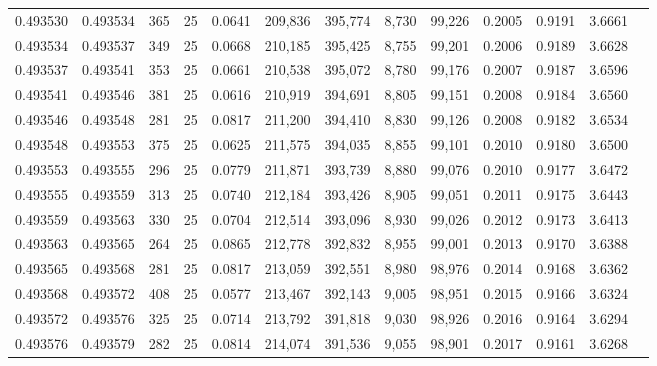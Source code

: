 \begin{tabular}{rrrrrrrrrrrrr}
0.493530 & 0.493534 &   365 &  25 &                                     0.0641 & 209,836 & 395,774 &   8,730 &  99,226 & 0.2005 & 0.9191 & 3.6661 \\
0.493534 & 0.493537 &   349 &  25 &                                     0.0668 & 210,185 & 395,425 &   8,755 &  99,201 & 0.2006 & 0.9189 & 3.6628 \\
0.493537 & 0.493541 &   353 &  25 &                                     0.0661 & 210,538 & 395,072 &   8,780 &  99,176 & 0.2007 & 0.9187 & 3.6596 \\
0.493541 & 0.493546 &   381 &  25 &                                     0.0616 & 210,919 & 394,691 &   8,805 &  99,151 & 0.2008 & 0.9184 & 3.6560 \\
0.493546 & 0.493548 &   281 &  25 &                                     0.0817 & 211,200 & 394,410 &   8,830 &  99,126 & 0.2008 & 0.9182 & 3.6534 \\
0.493548 & 0.493553 &   375 &  25 &                                     0.0625 & 211,575 & 394,035 &   8,855 &  99,101 & 0.2010 & 0.9180 & 3.6500 \\
0.493553 & 0.493555 &   296 &  25 &                                     0.0779 & 211,871 & 393,739 &   8,880 &  99,076 & 0.2010 & 0.9177 & 3.6472 \\
0.493555 & 0.493559 &   313 &  25 &                                     0.0740 & 212,184 & 393,426 &   8,905 &  99,051 & 0.2011 & 0.9175 & 3.6443 \\
0.493559 & 0.493563 &   330 &  25 &                                     0.0704 & 212,514 & 393,096 &   8,930 &  99,026 & 0.2012 & 0.9173 & 3.6413 \\
0.493563 & 0.493565 &   264 &  25 &                                     0.0865 & 212,778 & 392,832 &   8,955 &  99,001 & 0.2013 & 0.9170 & 3.6388 \\
0.493565 & 0.493568 &   281 &  25 &                                     0.0817 & 213,059 & 392,551 &   8,980 &  98,976 & 0.2014 & 0.9168 & 3.6362 \\
0.493568 & 0.493572 &   408 &  25 &                                     0.0577 & 213,467 & 392,143 &   9,005 &  98,951 & 0.2015 & 0.9166 & 3.6324 \\
0.493572 & 0.493576 &   325 &  25 &                                     0.0714 & 213,792 & 391,818 &   9,030 &  98,926 & 0.2016 & 0.9164 & 3.6294 \\
0.493576 & 0.493579 &   282 &  25 &                                     0.0814 & 214,074 & 391,536 &   9,055 &  98,901 & 0.2017 & 0.9161 & 3.6268 \\

\end{tabular}
